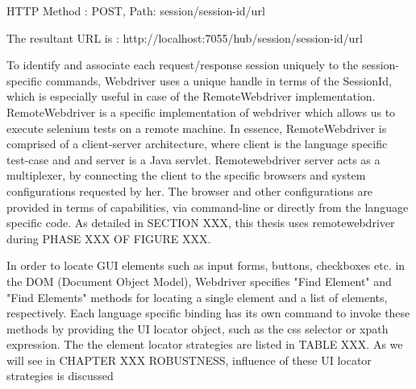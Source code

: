 HTTP Method : POST, Path: session/{session-id}/url

The resultant URL is :
http://localhost:7055/hub/session/{session-id}/url

To identify and associate each request/response session uniquely to the session-specific commands, Webdriver uses a unique handle in terms of the SessionId, which is especially useful in case of the RemoteWebdriver implementation. RemoteWebdriver is a specific implementation of webdriver which allows us to execute selenium tests on a remote machine. In essence, RemoteWebdriver is comprised of a client-server architecture, where client is the language specific test-case and and server is a Java servlet. Remotewebdriver server acts as a multiplexer, by connecting the client to the specific browsers and system configurations requested by her. The browser and other configurations are provided in terms of capabilities, via command-line or directly from the language specific code. As detailed in SECTION XXX, this thesis uses remotewebdriver during PHASE XXX OF FIGURE XXX.

In order to locate GUI elements such as input forms, buttons, checkboxes etc. in the DOM (Document Object Model), Webdriver specifies "Find Element" and "Find Elements" methods for locating a single element and a list of elements, respectively. Each language specific binding has its own command to invoke these methods by providing the UI locator object, such as the css selector or xpath expression. The the element locator strategies are listed in TABLE XXX. As we will see in CHAPTER XXX ROBUSTNESS, influence of these UI locator strategies is discussed 

\label{Chapter2} %

